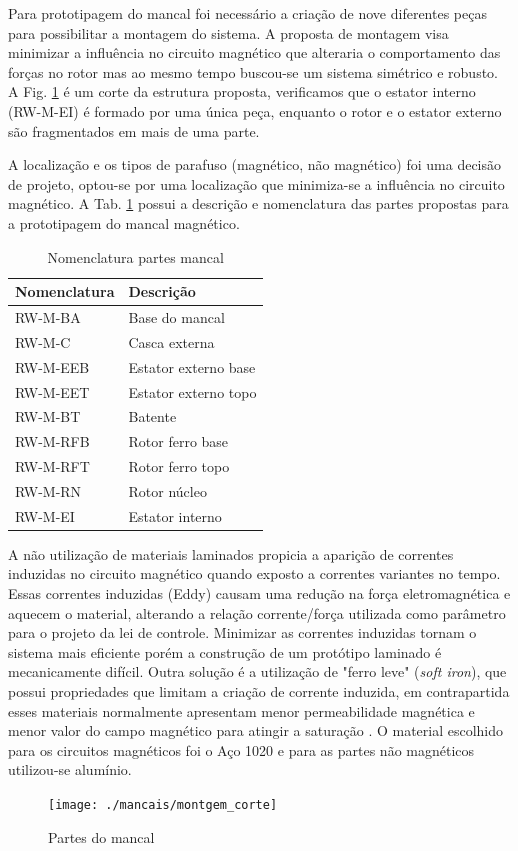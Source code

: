 Para prototipagem do mancal foi necessário a criação de nove diferentes peças para possibilitar a montagem do sistema. A proposta de montagem visa minimizar a influência no circuito magnético que alteraria o comportamento das forças no rotor mas ao mesmo tempo buscou-se um sistema simétrico e robusto.  A Fig. \ref{fig:montgem:corte} é um corte da estrutura proposta, verificamos que o estator interno (RW-M-EI) é formado por uma única peça, enquanto o rotor e o estator externo são fragmentados em mais de uma parte.

A localização e os tipos de parafuso (magnético, não magnético) foi uma decisão de projeto, optou-se por uma localização que minimiza-se a influência no circuito magnético. A Tab. \ref{Tab:nomenclatura:mancal} possui a descrição e nomenclatura das partes propostas para a prototipagem do mancal magnético.

 \begin{table}[ht!]
 	\centering
 	\begin{tabular}{l l}
 		Nomenclatura & Descrição  \\ \hline
 		RW-M-BA 		&	Base do mancal \\
 		RW-M-C   		 &	Casca externa\\
 		RW-M-EEB	  & Estator externo base\\
 		RW-M-EET & 	Estator externo topo\\
 		RW-M-BT & 	Batente\\
 		RW-M-RFB & 	Rotor ferro base\\
 		RW-M-RFT	&  Rotor ferro topo\\
 		RW-M-RN & 	Rotor núcleo\\
 		RW-M-EI	&  Estator interno\\
 	\end{tabular} 
 	\caption{Nomenclatura partes mancal}
 	\label{Tab:nomenclatura:mancal} 
 \end{table} 

 
A não utilização de materiais laminados propicia  a aparição de correntes induzidas  no circuito magnético quando exposto a correntes variantes no tempo. Essas correntes induzidas (Eddy) causam uma redução na força eletromagnética e aquecem o material, alterando a relação corrente/força utilizada como parâmetro para o projeto da lei de controle. Minimizar as correntes induzidas tornam o sistema mais eficiente porém a construção de um protótipo laminado é mecanicamente difícil. Outra solução é a utilização de "ferro leve" (\textit{soft iron}), que possui propriedades que limitam a criação de corrente induzida, em contrapartida esses materiais normalmente apresentam menor permeabilidade magnética e menor valor do campo magnético para atingir a saturação \citep{Han2013a}. O material escolhido para os circuitos magnéticos foi o Aço 1020 e para as partes não magnéticos utilizou-se alumínio.
  
\begin{figure}[th!]
\centering
\texttt{[image: ./mancais/montgem\_corte]}
\caption{Partes do mancal}
\label{fig:montgem:corte}
\end{figure}


